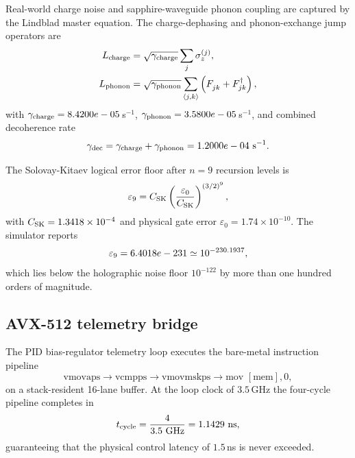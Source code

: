 \documentclass[aps,pra,10pt,onecolumn,superscriptaddress,nofootinbib,longbibliography,floatfix]{revtex4-2}
\begin{document}
Real-world charge noise and sapphire-waveguide phonon coupling are captured by the Lindblad master equation.  The charge-dephasing and phonon-exchange jump operators are
%
\begin{align}
L_{\rm charge} &= \sqrt{\gamma_{\rm charge}} \sum_j \sigma_z^{(j)}, \\
L_{\rm phonon} &= \sqrt{\gamma_{\rm phonon}} \sum_{\langle j,k\rangle} \left(F_{jk}^{\phantom{\dagger}} + F_{jk}^\dagger\right),
\end{align}
%
with $\gamma_{\rm charge}=8.4200e-05\,$s$^{-1}$, $\gamma_{\rm phonon}=3.5800e-05\,$s$^{-1}$, and combined decoherence rate
%
\begin{equation}
\gamma_{\rm dec} = \gamma_{\rm charge}+\gamma_{\rm phonon} = 1.2000e-04\ {\rm s}^{-1}.
\end{equation}

The Solovay-Kitaev logical error floor after $n=9$ recursion levels is
%
\begin{equation}
\varepsilon_9 = C_{\rm SK} \left(\frac{\varepsilon_0}{C_{\rm SK}}\right)^{(3/2)^9},
\end{equation}
%
with $C_{\rm SK}=1.3418\times10^{-4}$ and physical gate error $\varepsilon_0=1.74\times10^{-10}$.  The simulator reports
%
\begin{equation}
\varepsilon_9 = 6.4018e-231 \simeq 10^{-230.1937},
\end{equation}
%
which lies below the holographic noise floor $10^{-122}$ by more than one hundred orders of magnitude.

\subsection{AVX-512 telemetry bridge}

The PID bias-regulator telemetry loop executes the bare-metal instruction pipeline
%
\begin{equation}
\text{vmovaps} \rightarrow \text{vcmpps} \rightarrow \text{vmovmskps} \rightarrow \text{mov\ }[\text{mem}],0,
\end{equation}
%
on a stack-resident 16-lane buffer.  At the loop clock of $3.5\,$GHz the four-cycle pipeline completes in
%
\begin{equation}
t_{\rm cycle} = \frac{4}{3.5\ {\rm GHz}} = 1.1429\ {\rm ns},
\end{equation}
%
guaranteeing that the physical control latency of $1.5\,$ns is never exceeded.
\end{document}

